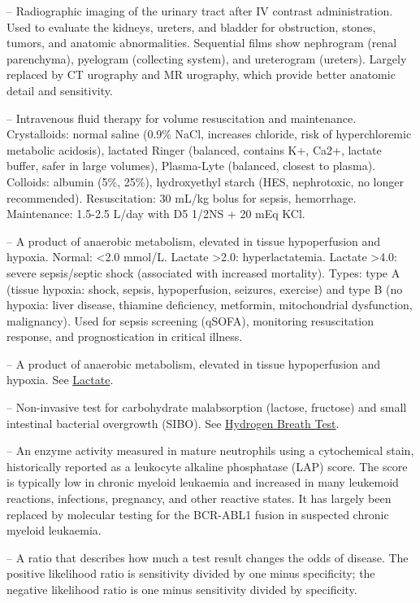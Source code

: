 -- Radiographic imaging of the urinary tract after IV contrast administration. Used to evaluate the kidneys, ureters, and bladder for obstruction, stones, tumors, and anatomic abnormalities. Sequential films show nephrogram (renal parenchyma), pyelogram (collecting system), and ureterogram (ureters). Largely replaced by CT urography and MR urography, which provide better anatomic detail and sensitivity.

-- Intravenous fluid therapy for volume resuscitation and maintenance. Crystalloids: normal saline (0.9\% NaCl, increases chloride, risk of hyperchloremic metabolic acidosis), lactated Ringer (balanced, contains K+, Ca2+, lactate buffer, safer in large volumes), Plasma-Lyte (balanced, closest to plasma). Colloids: albumin (5\%, 25\%), hydroxyethyl starch (HES, nephrotoxic, no longer recommended). Resuscitation: 30 mL/kg bolus for sepsis, hemorrhage. Maintenance: 1.5-2.5 L/day with D5 1/2NS + 20 mEq KCl.


-- A product of anaerobic metabolism, elevated in tissue hypoperfusion and hypoxia. Normal: <2.0 mmol/L. Lactate >2.0: hyperlactatemia. Lactate >4.0: severe sepsis/septic shock (associated with increased mortality). Types: type A (tissue hypoxia: shock, sepsis, hypoperfusion, seizures, exercise) and type B (no hypoxia: liver disease, thiamine deficiency, metformin, mitochondrial dysfunction, malignancy). Used for sepsis screening (qSOFA), monitoring resuscitation response, and prognostication in critical illness.

-- A product of anaerobic metabolism, elevated in tissue hypoperfusion and hypoxia. See \hyperlink{Lactate}{Lactate}.

-- Non-invasive test for carbohydrate malabsorption (lactose, fructose) and small intestinal bacterial overgrowth (SIBO). See \hyperlink{Hydrogen Breath Test}{Hydrogen Breath Test}.

-- An enzyme activity measured in mature neutrophils using a cytochemical stain, historically reported as a leukocyte alkaline phosphatase (LAP) score. The score is typically low in chronic myeloid leukaemia and increased in many leukemoid reactions, infections, pregnancy, and other reactive states. It has largely been replaced by molecular testing for the BCR-ABL1 fusion in suspected chronic myeloid leukaemia.

-- A ratio that describes how much a test result changes the odds of disease. The positive likelihood ratio is sensitivity divided by one minus specificity; the negative likelihood ratio is one minus sensitivity divided by specificity.


